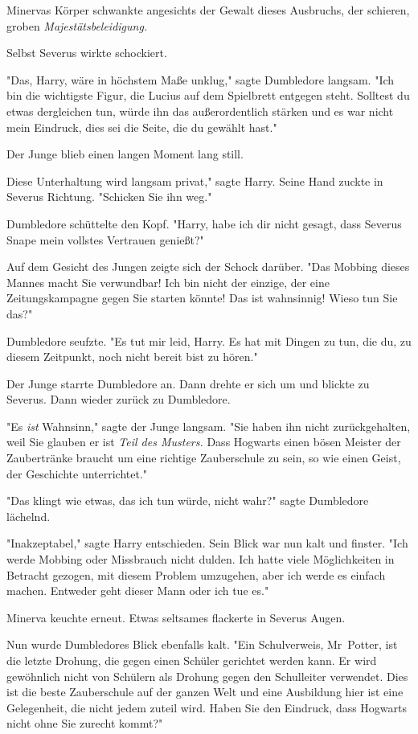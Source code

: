 {Minervas Körper schwankte angesichts der Gewalt dieses Ausbruchs, der schieren, groben \emph{Majestätsbeleidigung.}

Selbst Severus wirkte schockiert.

"Das, Harry, wäre in höchstem Maße unklug," sagte Dumbledore langsam. "Ich bin die wichtigste Figur, die Lucius auf dem Spielbrett entgegen steht. Solltest du etwas dergleichen tun, würde ihn das außerordentlich stärken und es war nicht mein Eindruck, dies sei die Seite, die du gewählt hast."

Der Junge blieb einen langen Moment lang still.

Diese Unterhaltung wird langsam privat," sagte Harry. Seine Hand zuckte in Severus Richtung. "Schicken Sie ihn weg."

Dumbledore schüttelte den Kopf. "Harry, habe ich dir nicht gesagt, dass Severus Snape mein vollstes Vertrauen genießt?"

Auf dem Gesicht des Jungen zeigte sich der Schock darüber. "Das Mobbing dieses Mannes macht Sie verwundbar! Ich bin nicht der einzige, der eine Zeitungskampagne gegen Sie starten könnte! Das ist wahnsinnig! Wieso tun Sie das?"

Dumbledore seufzte. "Es tut mir leid, Harry. Es hat mit Dingen zu tun, die du, zu diesem Zeitpunkt, noch nicht bereit bist zu hören."

Der Junge starrte Dumbledore an. Dann drehte er sich um und blickte zu Severus. Dann wieder zurück zu Dumbledore.

"Es \emph{ist} Wahnsinn," sagte der Junge langsam. "Sie haben ihn nicht zurückgehalten, weil Sie glauben er ist \emph{Teil des Musters.} Dass Hogwarts einen bösen Meister der Zaubertränke braucht um eine richtige Zauberschule zu sein, so wie einen Geist, der Geschichte unterrichtet."

"Das klingt wie etwas, das ich tun würde, nicht wahr?" sagte Dumbledore lächelnd.

"Inakzeptabel," sagte Harry entschieden. Sein Blick war nun kalt und finster. "Ich werde Mobbing oder Missbrauch nicht dulden. Ich hatte viele Möglichkeiten in Betracht gezogen, mit diesem Problem umzugehen, aber ich werde es einfach machen. Entweder geht dieser Mann oder ich tue es."

Minerva keuchte erneut. Etwas seltsames flackerte in Severus Augen.

Nun wurde Dumbledores Blick ebenfalls kalt. "Ein Schulverweis, Mr~Potter, ist die letzte Drohung, die gegen einen Schüler gerichtet werden kann. Er wird gewöhnlich nicht von Schülern als Drohung gegen den Schulleiter verwendet. Dies ist die beste Zauberschule auf der ganzen Welt und eine Ausbildung hier ist eine Gelegenheit, die nicht jedem zuteil wird. Haben Sie den Eindruck, dass Hogwarts nicht ohne Sie zurecht kommt?"

}
